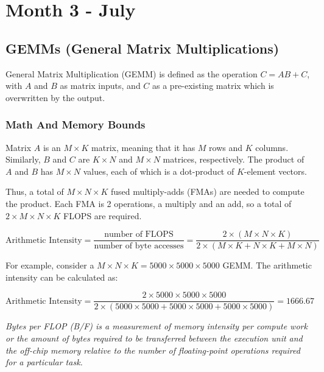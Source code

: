 \clearpage

\section{Month 3 - July}

\subsection{GEMMs (General Matrix Multiplications)}

General Matrix Multiplication (GEMM) is defined as the operation $C = AB + C$, with $A$ and $B$ as matrix inputs, and $C$ as a pre-existing matrix which is overwritten by the output.

\subsubsection{Math And Memory Bounds}


Matrix $A$ is an $M \times K$ matrix, meaning that it has $M$ rows and $K$ columns. Similarly, $B$ and $C$ are $K \times N$ and $M \times N$ matrices, respectively. The product of $A$ and $B$ has $M \times N$ values, each of which is a dot-product of $K$-element vectors.

Thus, a total of $M \times N \times K$ fused multiply-adds (FMAs) are needed to compute the product. Each FMA is 2 operations, a multiply and an add, so a total of $2 \times M \times N \times K$ FLOPS are required.


\begin{equation}
\text{Arithmetic Intensity} = \frac{\text{number of FLOPS}}{\text{number of byte accesses}} = \frac{2 \times (M \times N \times K)}{2 \times (M \times K + N \times K + M \times N)}
\end{equation}


For example, consider a $M \times N \times K = 5000 \times 5000 \times 5000$ GEMM. The arithmetic intensity can be calculated as:

\begin{equation}
\text{Arithmetic Intensity} = \frac{2 \times 5000 \times 5000 \times 5000}{2 \times (5000 \times 5000 + 5000 \times 5000 + 5000 \times 5000)} = 1666.67
\end{equation}

\textit{Bytes per FLOP (B/F) is a measurement of memory intensity per compute work or the amount of bytes required to be transferred between the execution unit and the off-chip memory relative to the number of floating-point operations required for a particular task.}

